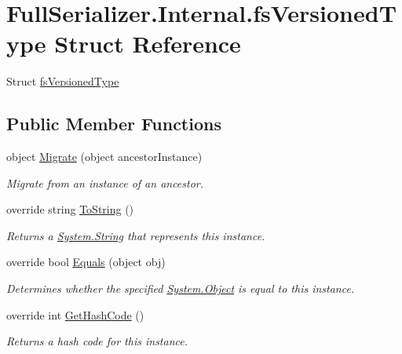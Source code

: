 \hypertarget{struct_full_serializer_1_1_internal_1_1fs_versioned_type}{}\section{Full\+Serializer.\+Internal.\+fs\+Versioned\+Type Struct Reference}
\label{struct_full_serializer_1_1_internal_1_1fs_versioned_type}


Struct \hyperlink{struct_full_serializer_1_1_internal_1_1fs_versioned_type}{fs\+Versioned\+Type}  


\subsection*{Public Member Functions}
\begin{DoxyCompactItemize}
\item 
object \hyperlink{struct_full_serializer_1_1_internal_1_1fs_versioned_type_aefcd1ab3a71a9c8d5d9740bfc4d2bec2}{Migrate} (object ancestor\+Instance)
\begin{DoxyCompactList}\small\item\em Migrate from an instance of an ancestor. \end{DoxyCompactList}\item 
override string \hyperlink{struct_full_serializer_1_1_internal_1_1fs_versioned_type_a00a4df4bd28d37f0ce3eba8d478cfb0c}{To\+String} ()
\begin{DoxyCompactList}\small\item\em Returns a \hyperlink{namespace_full_serializer_a6eee33d63b94e40fdfcfc59af9fcfc82a27118326006d3829667a400ad23d5d98}{System.\+String} that represents this instance. \end{DoxyCompactList}\item 
override bool \hyperlink{struct_full_serializer_1_1_internal_1_1fs_versioned_type_a03287eaf9b0c058981d26039ee69e12d}{Equals} (object obj)
\begin{DoxyCompactList}\small\item\em Determines whether the specified \hyperlink{namespace_full_serializer_a6eee33d63b94e40fdfcfc59af9fcfc82a497031794414a552435f90151ac3b54b}{System.\+Object} is equal to this instance. \end{DoxyCompactList}\item 
override int \hyperlink{struct_full_serializer_1_1_internal_1_1fs_versioned_type_a6c89963039a787e467fbb6b14314f190}{Get\+Hash\+Code} ()
\begin{DoxyCompactList}\small\item\em Returns a hash code for this instance. \end{DoxyCompactList}\end{DoxyCompactItemize}
